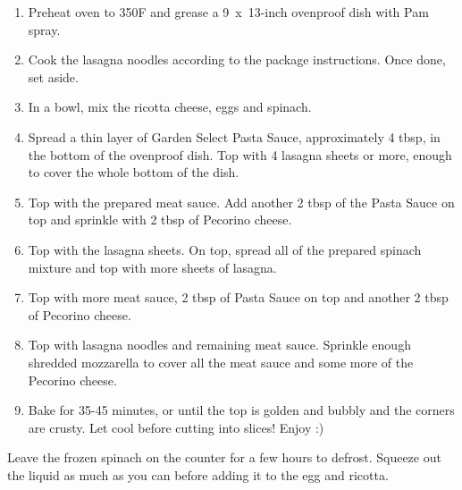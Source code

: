 \begin{enumerate}
    \item Preheat oven to 350\degree F and grease a 9~x~13-inch ovenproof dish with Pam spray.
    \item Cook the lasagna noodles according to the package instructions. Once done, set aside.
    \item In a bowl, mix the ricotta cheese, eggs and spinach.
    \item Spread a thin layer of Garden Select Pasta Sauce, approximately 4 tbsp, in the bottom of the ovenproof dish. Top with 4 lasagna sheets or more, enough to cover the whole bottom of the dish.
    \item Top with the prepared meat sauce. Add another 2 tbsp of the Pasta Sauce on top and sprinkle with 2 tbsp of Pecorino cheese.
    \item Top with the lasagna sheets. On top, spread all of the prepared spinach mixture and top with more sheets of lasagna.
    \item Top with more meat sauce, 2 tbsp of Pasta Sauce on top and another 2 tbsp of Pecorino cheese.
    \item Top with lasagna noodles and remaining meat sauce. Sprinkle enough shredded mozzarella to cover all the meat sauce and some more of the Pecorino cheese.
    \item Bake for 35-45 minutes, or until the top is golden and bubbly and the corners are crusty. Let cool before cutting into slices! Enjoy :)
\end{enumerate}

Leave the frozen spinach on the counter for a few hours to defrost. Squeeze out the liquid as much as you can before adding it to the egg and ricotta.

